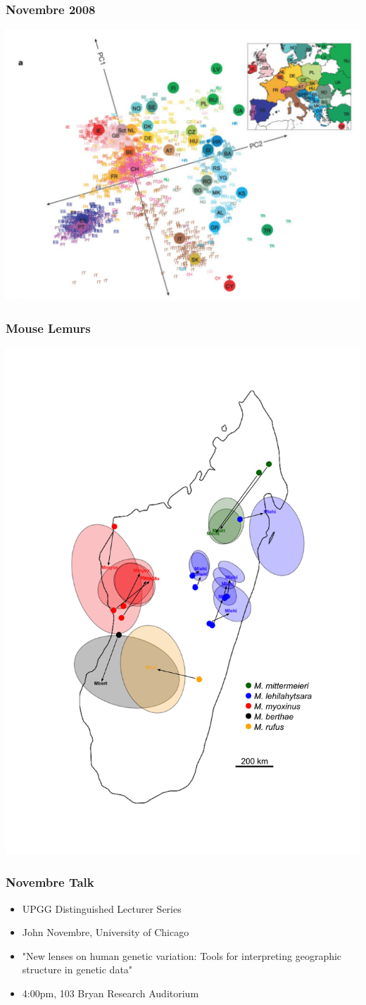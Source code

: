 \documentclass[14pt,handout]{beamer}
\begin{document}
\begin{frame}
\frametitle{Novembre 2008}
\begin{center}
		\includegraphics[width=.8\textwidth]{images_20171102_gg04.png}
\end{center}
\end{frame}

\begin{frame}
\frametitle{Mouse Lemurs}
\begin{center}
		\includegraphics[width=.5\textwidth]{images_20171102_gg05.png}
\end{center}
\end{frame}



\begin{frame}
\frametitle{Novembre Talk}
\begin{itemize}
	\item[] UPGG Distinguished Lecturer Series
	\item[] John Novembre, University of Chicago
	\item[] "New lenses on human genetic variation: Tools for interpreting geographic structure in genetic data"
	\item[] 4:00pm, 103 Bryan Research Auditorium
\end{itemize}
\end{frame}
\end{document}
